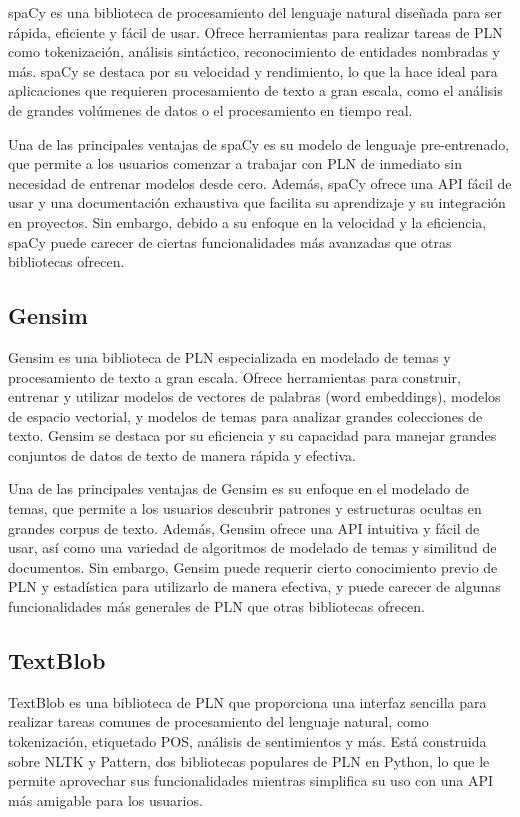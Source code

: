 spaCy es una biblioteca de procesamiento del lenguaje natural diseñada para ser rápida, eficiente y fácil de usar. Ofrece herramientas para realizar tareas de PLN como tokenización, análisis sintáctico, reconocimiento de entidades nombradas y más. spaCy se destaca por su velocidad y rendimiento, lo que la hace ideal para aplicaciones que requieren procesamiento de texto a gran escala, como el análisis de grandes volúmenes de datos o el procesamiento en tiempo real.

Una de las principales ventajas de spaCy es su modelo de lenguaje pre-entrenado, que permite a los usuarios comenzar a trabajar con PLN de inmediato sin necesidad de entrenar modelos desde cero. Además, spaCy ofrece una API fácil de usar y una documentación exhaustiva que facilita su aprendizaje y su integración en proyectos. Sin embargo, debido a su enfoque en la velocidad y la eficiencia, spaCy puede carecer de ciertas funcionalidades más avanzadas que otras bibliotecas ofrecen.

\subsection{Gensim}

Gensim es una biblioteca de PLN especializada en modelado de temas y procesamiento de texto a gran escala. Ofrece herramientas para construir, entrenar y utilizar modelos de vectores de palabras (word embeddings), modelos de espacio vectorial, y modelos de temas para analizar grandes colecciones de texto. Gensim se destaca por su eficiencia y su capacidad para manejar grandes conjuntos de datos de texto de manera rápida y efectiva.

Una de las principales ventajas de Gensim es su enfoque en el modelado de temas, que permite a los usuarios descubrir patrones y estructuras ocultas en grandes corpus de texto. Además, Gensim ofrece una API intuitiva y fácil de usar, así como una variedad de algoritmos de modelado de temas y similitud de documentos. Sin embargo, Gensim puede requerir cierto conocimiento previo de PLN y estadística para utilizarlo de manera efectiva, y puede carecer de algunas funcionalidades más generales de PLN que otras bibliotecas ofrecen.

\subsection{TextBlob}

TextBlob es una biblioteca de PLN que proporciona una interfaz sencilla para realizar tareas comunes de procesamiento del lenguaje natural, como tokenización, etiquetado POS, análisis de sentimientos y más. Está construida sobre NLTK y Pattern, dos bibliotecas populares de PLN en Python, lo que le permite aprovechar sus funcionalidades mientras simplifica su uso con una API más amigable para los usuarios.

